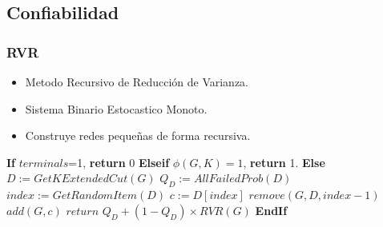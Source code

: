 \subsection{Confiabilidad}
\begin{frame}\frametitle{RVR}
\begin{block}{}
\begin{small}
\begin{itemize}
 \item Metodo Recursivo de Reducción de Varianza.
 \item Sistema Binario Estocastico Monoto.
 \item Construye redes pequeñas de forma recursiva.
\end{itemize} 
\end{small}
\end{block}
\begin{block}{}
\begin{algorithm}[H]
\caption{$RVR(G,K,p_v,p_e)$}
\begin{algorithmic}[1]
\begin{scriptsize}
\STATE \textbf{If} $terminals$=1, \textbf{return} $0$
\STATE \textbf{Elseif} $\phi(G,K)=1$, \textbf{return} 1.
\STATE \textbf{Else} 
\STATE $D := GetKExtendedCut(G)$
\STATE $Q_{D} := AllFailedProb(D)$
\STATE $index := GetRandomItem(D)$
\STATE $c := D[index]$
\STATE $remove(G,D, index - 1)$
\STATE $add(G, c)$
\STATE $return \, \, Q_{D} + (1 - Q_{D})\times RVR(G)$
\STATE \textbf{EndIf}
\end{scriptsize}
\end{algorithmic}
\end{algorithm}
\end{block}
\end{frame}



